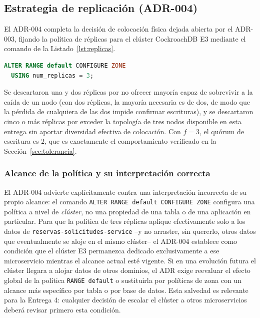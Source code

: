 \documentclass[10pt,twocolumn]{article}
\begin{document}
\subsection{Estrategia de replicación (ADR-004)}

El ADR-004 completa la decisión de colocación física dejada abierta por el
ADR-003, fijando la política de réplicas para el clúster CockroachDB E3
mediante el comando de la Listado~\ref{lst:replicas}.

\begin{lstlisting}[language=sql,caption={Política de replicación del clúster E3 (ADR-004).},label={lst:replicas}]
ALTER RANGE default CONFIGURE ZONE
  USING num_replicas = 3;
\end{lstlisting}

Se descartaron una y dos réplicas por no ofrecer mayoría capaz de
sobrevivir a la caída de un nodo (con dos réplicas, la mayoría necesaria es
de dos, de modo que la pérdida de cualquiera de las dos impide confirmar
escrituras), y se descartaron cinco o más réplicas por exceder la topología
de tres nodos disponible en esta entrega sin aportar diversidad efectiva de
colocación. Con $f=3$, el quórum de escritura es $2$, que es exactamente el
comportamiento verificado en la Sección~\ref{sec:tolerancia}.

\subsubsection{Alcance de la política y su interpretación correcta}

El ADR-004 advierte explícitamente contra una interpretación incorrecta de
su propio alcance: el comando \texttt{ALTER RANGE default CONFIGURE ZONE}
configura una política a nivel de \emph{clúster}, no una propiedad de una
tabla o de una aplicación en particular. Para que la política de tres
réplicas aplique efectivamente solo a los datos de
\texttt{reservas-solicitudes-service} --y no arrastre, sin quererlo, otros
datos que eventualmente se aloje en el mismo clúster-- el ADR-004 establece
como condición que el clúster E3 permanezca dedicado exclusivamente a ese
microservicio mientras el alcance actual esté vigente. Si en una evolución
futura el clúster llegara a alojar datos de otros dominios, el ADR exige
reevaluar el efecto global de la política \texttt{RANGE default} o
sustituirla por políticas de zona con un alcance más específico por tabla
o por base de datos. Esta salvedad es relevante para la Entrega 4: cualquier
decisión de escalar el clúster a otros microservicios deberá revisar
primero esta condición.
\end{document}
